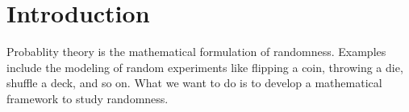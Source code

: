 \section{Introduction}
Probablity theory is the mathematical formulation of randomness.
Examples include the modeling of random experiments like flipping a coin, throwing a die, shuffle a deck, and so on.
What we want to do is to develop a mathematical framework to study randomness.
